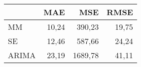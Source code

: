 \begin{tabular}{lrrr}
\toprule
 & MAE & MSE & RMSE \\
\midrule
MM & 10,24 & 390,23 & 19,75 \\
SE & 12,46 & 587,66 & 24,24 \\
ARIMA & 23,19 & 1689,78 & 41,11 \\
\bottomrule
\end{tabular}
